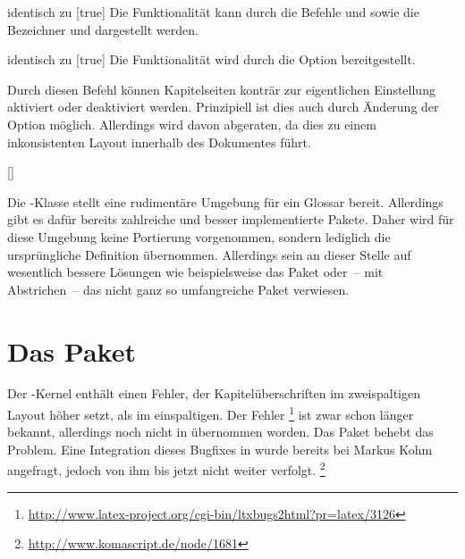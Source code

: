 \documentclass[%
  english,ngerman,%
  headings=optiontoheadandtoc,captions=tableheading,numbers=noenddot,%
  chapterpage,cdfoot,%
]{tudscrman}
\begin{document}
\begin{Declaration}{}{%
  identisch zu [true]%
}
\printdeclarationlist%
Die Funktionalität kann durch die Befehle  und 
 sowie die Bezeichner  und 
 dargestellt werden.
\end{Declaration}

\begin{Declaration}{}{%
  identisch zu [true]%
}
\printdeclarationlist%
Die Funktionalität wird durch die Option  bereitgestellt.
\end{Declaration}

\begin{Declaration}{}
\printdeclarationlist%
Durch diesen Befehl können Kapitelseiten konträr zur eigentlichen Einstellung 
aktiviert oder deaktiviert werden. Prinzipiell ist dies auch durch Änderung der 
Option  möglich. Allerdings wird davon abgeraten, da dies zu 
einem inkonsistenten Layout innerhalb des Dokumentes führt.
\end{Declaration}

\begin{Declaration}{[]}
\begin{Declaration}{}
\printdeclarationlist%
Die -Klasse stellt eine rudimentäre Umgebung für ein Glossar 
bereit. Allerdings gibt es dafür bereits zahlreiche und besser implementierte 
Pakete. Daher wird für diese Umgebung keine Portierung vorgenommen, sondern 
lediglich die ursprüngliche Definition übernommen. Allerdings sein an dieser 
Stelle auf wesentlich bessere Lösungen wie beispielsweise das Paket 
 oder~-- mit Abstrichen~-- das nicht ganz so umfangreiche 
Paket  verwiesen. 
\end{Declaration}
\end{Declaration}


\section{Das Paket }
%
Der -Kernel enthält einen Fehler, der Kapitelüberschriften im
zweispaltigen Layout höher setzt, als im einspaltigen. Der Fehler%
\footnote{\url{http://www.latex-project.org/cgi-bin/ltxbugs2html?pr=latex/3126}}
ist zwar schon länger bekannt, allerdings noch nicht in  
übernommen worden. Das Paket  behebt das Problem. Eine 
Integration dieses Bugfixes in \KOMAScript{} wurde bereits bei Markus Kohm 
angefragt, jedoch von ihm bis jetzt nicht weiter verfolgt.%
\footnote{\url{http://www.komascript.de/node/1681}}
\end{document}
